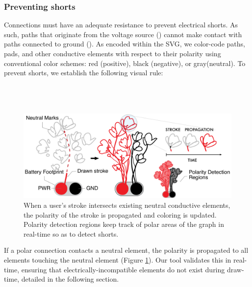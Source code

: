 \documentclass{sigchi}
\begin{document}
    \subsubsection{Preventing shorts}
    Connections must have an adequate resistance to prevent electrical shorts. As such, paths that originate from the voltage source () cannot make contact with paths connected to ground (). As encoded within the SVG, we color-code paths, pads, and other conductive elements with respect to their polarity using conventional color schemes: red (positive), black (negative), or gray(neutral). To prevent shorts, we establish the following visual rule:
    \\
    \\
    \noindent{}
    \\
    \\
\begin{figure}[h]
\centering
\includegraphics[width=1.0\columnwidth]{figures/propagation.pdf}
\caption{When a user's stroke intersects existing neutral conductive elements, the polarity of the stroke is propagated and coloring is updated. Polarity detection regions keep track of polar areas of the graph in real-time so as to detect shorts.}

\label{fig:propagation}
\end{figure}
    If a polar connection contacts a neutral element, the polarity is propagated to all elements touching the neutral element (Figure \ref{fig:propagation}). 
    Our tool validates this in real-time, ensuring that electrically-incompatible elements do not exist during draw-time, detailed in the following section. 

    \noindent{}
\end{document}
